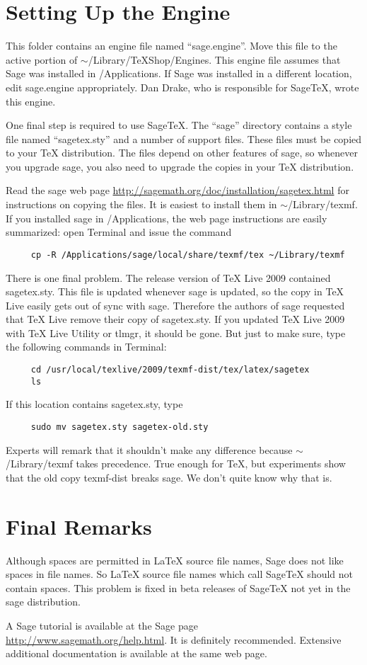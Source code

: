 \documentclass[11pt, oneside]{amsart}
\begin{document}
\newpage
\section{Setting Up the Engine}

This folder contains an engine file named ``sage.engine''. Move this file to the active portion of $\sim$/Library/TeXShop/Engines. This engine file assumes that Sage was installed in /Applications. If Sage was installed in a different location, edit sage.engine appropriately. Dan Drake, who is responsible for SageTeX, wrote this engine.

One final step is required to use SageTeX. The ``sage'' directory contains a style file named ``sagetex.sty'' and a number of support files. These files must be copied to your TeX distribution. The files depend on other features of sage, so whenever you upgrade sage, you also need to upgrade the copies in your TeX distribution.

Read the sage web page \url{http://sagemath.org/doc/installation/sagetex.html} for instructions on copying the files. It is easiest to install them in $\sim$/Library/texmf. If you installed sage in /Applications, the web page instructions are easily summarized: open Terminal and issue the command
\begin{verbatim}
     cp -R /Applications/sage/local/share/texmf/tex ~/Library/texmf
\end{verbatim}


There is one final problem. The release version of TeX Live 2009 contained sagetex.sty. This file is updated whenever sage is updated, so the copy in TeX Live easily gets out of sync with sage. Therefore the authors of sage requested that TeX Live remove their copy of sagetex.sty. If you updated TeX Live 2009 with TeX Live Utility or tlmgr, it should be gone. But just to make sure, type the following commands in Terminal:
\begin{verbatim}
     cd /usr/local/texlive/2009/texmf-dist/tex/latex/sagetex
     ls
\end{verbatim}
If this location contains sagetex.sty, type
\begin{verbatim}
     sudo mv sagetex.sty sagetex-old.sty
\end{verbatim}
Experts will remark that it shouldn't make any difference because $\sim$/Library/texmf takes precedence. True enough for TeX, but experiments show that the old copy texmf-dist breaks sage. We don't quite know why that is. 



\section{Final Remarks}
Although spaces are permitted in LaTeX source file names, Sage does not like spaces in file names. So LaTeX source file names which call SageTeX should not contain spaces. This problem is fixed in beta releases of SageTeX not yet in the sage distribution.

A Sage tutorial is available at the Sage page \url{http://www.sagemath.org/help.html}. It is definitely recommended. Extensive additional documentation is available at the same web page.
\end{document}
